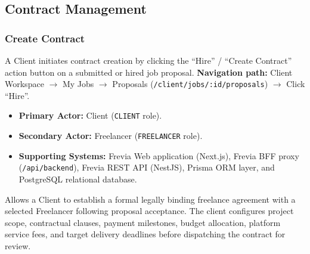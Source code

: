 
\subsection{Contract Management}

\subsubsection{ Create Contract}

A Client initiates contract creation by clicking the ``Hire'' / ``Create Contract'' action button on a submitted or hired job proposal.\newline
\textbf{Navigation path:} Client Workspace $\rightarrow$ My Jobs $\rightarrow$ Proposals (\texttt{/\allowbreak{}client/\allowbreak{}jobs/\allowbreak{}:\allowbreak{}id/\allowbreak{}proposals}) $\rightarrow$ Click ``Hire''.


\begin{itemize}[leftmargin=1.6em,topsep=3pt,itemsep=2pt,parsep=0pt,label=$\bullet$]
      \item \textbf{Primary Actor:} Client (\texttt{CLIENT} role).
      \item \textbf{Secondary Actor:} Freelancer (\texttt{FREELANCER} role).
      \item \textbf{Supporting Systems:} Frevia Web application (Next.js), Frevia BFF proxy (\texttt{/api/backend}), Frevia REST API (NestJS), Prisma ORM layer, and PostgreSQL relational database.
\end{itemize}

\noindent Allows a Client to establish a formal legally binding freelance agreement with a selected Freelancer following proposal acceptance. The client configures project scope, contractual clauses, payment milestones, budget allocation, platform service fees, and target delivery deadlines before dispatching the contract for review.

